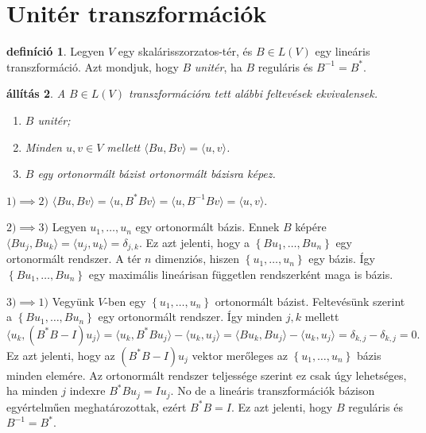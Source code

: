 \documentclass[9pt, a4paper, showtrims]{memoir}
\makeatletter
\renewenvironment{proof}[1][\proofname]
    {\par\pushQED{\qed}%
    \normalfont \topsep6\p@\@plus6\p@\relax
    \trivlist
    \item[\hskip\labelsep
        \itshape
    #1\@addpunct{:}]\ignorespaces}
    {\popQED\endtrivlist\@endpefalse}
\theoremstyle{plain}
\newtheorem{proposition}{állítás}[chapter]
\theoremstyle{remark}
\theoremstyle{definition}
\newtheorem{definition}[proposition]{definíció}
\newcommand{\ip}[2]{\langle#1,#2\rangle}
\makeatother
\begin{document}
\section{Unitér transzformációk}
\begin{definition}
    Legyen $V$ egy skalárisszorzatos-tér, és $B\in L\left( V \right)$ egy lineáris transzformáció.
    Azt mondjuk, hogy $B$
    \emph{unitér},
    ha $B$ reguláris és $B^{-1}=B^\ast$.
\end{definition}
\begin{proposition}
    A $B\in L\left( V \right)$ transzformációra tett alábbi feltevések ekvivalensek.
    \begin{enumerate}
        \item $B$ unitér;
        \item Minden $u,v\in V$ mellett $\ip{Bu}{Bv}=\ip{u}{v}$.
        \item $B$ egy ortonormált bázist ortonormált bázisra képez.
            \qedhere
    \end{enumerate}
\end{proposition}
\begin{proof}
    $1)\implies 2)$
    \begin{math}
        \ip{Bu}{Bv}
        =
        \ip{u}{B^\ast Bv}
        =
        \ip{u}{B^{-1}Bv}
        =
        \ip{u}{v}.
    \end{math}

    \noindent
    $2)\implies 3)$
    Legyen $u_1,\dots,u_n$ egy ortonormált bázis.
    Ennek $B$ képére
    \begin{math}
        \ip{Bu_j}{Bu_k}
        =
        \ip{u_j}{u_k}
        =\delta_{j,k}.
    \end{math}
    Ez azt jelenti, hogy a $\left\{ Bu_1,\dots,Bu_n \right\}$ egy ortonormált rendszer.
    A tér $n$ dimenziós, hiszen $\left\{ u_1,\dots,u_n \right\}$ egy bázis.
    Így
    $\left\{ Bu_1,\dots,Bu_n \right\}$ egy maximális lineárisan független rendszerként maga is bázis.

    \noindent
    $3)\implies 1)$
    Vegyünk $V$-ben egy $\left\{ u_1,\dots,u_n \right\}$ ortonormált bázist.
    Feltevésünk szerint a $\left\{ Bu_1,\dots,Bu_n \right\}$ egy ortonormált rendszer.
    Így minden $j,k$ mellett
    \begin{displaymath}
        \ip{u_k}{\left( B^\ast B-I \right)u_j}
        =
        \ip{u_k}{B^\ast Bu_j}-\ip{u_k}{u_j} 
        =
        \ip{Bu_k}{Bu_j}-\ip{u_k}{u_j}
        =
        \delta_{k,j}-\delta_{k,j}
        =
        0.
    \end{displaymath}
    Ez azt jelenti, hogy az $(B^\ast B-I)u_j$ vektor merőleges az $\left\{ u_1,\dots,u_n \right\}$ bázis minden elemére.
    Az ortonormált rendszer teljessége szerint ez csak úgy lehetséges, ha minden $j$ indexre $B^\ast Bu_j=Iu_j$.
    No de a lineáris transzformációk bázison egyértelműen meghatározottak,
    ezért $B^\ast B=I$.
    Ez azt jelenti, hogy $B$ reguláris és $B^{-1}=B^\ast$.
\end{proof}
\end{document}
